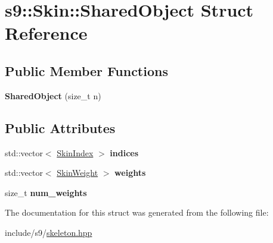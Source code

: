 \hypertarget{structs9_1_1Skin_1_1SharedObject}{\section{s9\-:\-:Skin\-:\-:Shared\-Object Struct Reference}
\label{structs9_1_1Skin_1_1SharedObject}
}
\subsection*{Public Member Functions}
\begin{DoxyCompactItemize}
\item 
\hypertarget{structs9_1_1Skin_1_1SharedObject_ae6b43394b6457e4e8cee4b4848ef3043}{{\bfseries Shared\-Object} (size\-\_\-t n)}\label{structs9_1_1Skin_1_1SharedObject_ae6b43394b6457e4e8cee4b4848ef3043}

\end{DoxyCompactItemize}
\subsection*{Public Attributes}
\begin{DoxyCompactItemize}
\item 
\hypertarget{structs9_1_1Skin_1_1SharedObject_a284d3d26653580775092874706a2b289}{std\-::vector$<$ \hyperlink{structs9_1_1Skin_1_1SkinIndex}{Skin\-Index} $>$ {\bfseries indices}}\label{structs9_1_1Skin_1_1SharedObject_a284d3d26653580775092874706a2b289}

\item 
\hypertarget{structs9_1_1Skin_1_1SharedObject_ade46dda2b9f71df1adcb2aab9b1d0d6f}{std\-::vector$<$ \hyperlink{structs9_1_1Skin_1_1SkinWeight}{Skin\-Weight} $>$ {\bfseries weights}}\label{structs9_1_1Skin_1_1SharedObject_ade46dda2b9f71df1adcb2aab9b1d0d6f}

\item 
\hypertarget{structs9_1_1Skin_1_1SharedObject_af2211581250f325c4d3678f08a9a199b}{size\-\_\-t {\bfseries num\-\_\-weights}}\label{structs9_1_1Skin_1_1SharedObject_af2211581250f325c4d3678f08a9a199b}

\end{DoxyCompactItemize}


The documentation for this struct was generated from the following file\-:\begin{DoxyCompactItemize}
\item 
include/s9/\hyperlink{skeleton_8hpp}{skeleton.\-hpp}\end{DoxyCompactItemize}
